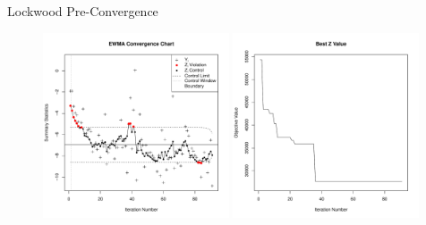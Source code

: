 \documentclass[ xcolor = pdftex, dvipsnames, table ]{beamer}
\begin{document}
%
%

\begin{frame}{Lockwood Pre-Convergence}
\begin{figure}[h!]%
        \includegraphics[width=0.49\textwidth]{ewmaConvChartLock6Three20000Start.pdf}
        \includegraphics[width=0.49\textwidth]{bestZLock6Three20000Start.pdf}
\end{figure}
\end{frame}

%
%
\end{document}
